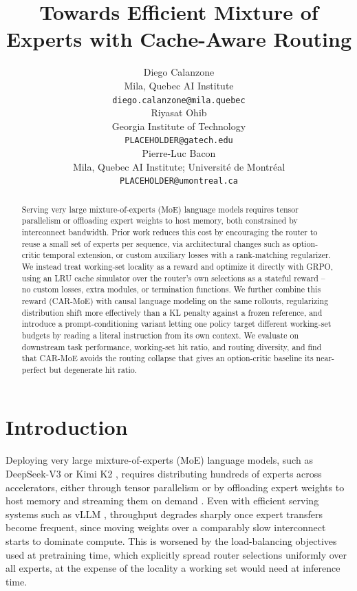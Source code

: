 \documentclass{article}
\title{Towards Efficient Mixture of Experts with Cache-Aware Routing}
\author{
  Diego Calanzone \\
  Mila, Quebec AI Institute \\
  \texttt{diego.calanzone@mila.quebec} \\[1em]
  Riyasat Ohib \\
  Georgia Institute of Technology \\
  \texttt{PLACEHOLDER@gatech.edu} \\[1em]
  Pierre-Luc Bacon \\
  Mila, Quebec AI Institute; Universit\'e de Montr\'eal \\
  \texttt{PLACEHOLDER@umontreal.ca}
}
\begin{document}
\maketitle

\begin{abstract}
Serving very large mixture-of-experts (MoE) language models requires tensor parallelism
or offloading expert weights to host memory, both constrained by interconnect bandwidth.
Prior work reduces this cost by encouraging the router to reuse a small set of experts per
sequence, via architectural changes such as option-critic temporal extension, or custom
auxiliary losses with a rank-matching regularizer. We instead treat working-set locality
as a reward and optimize it directly with GRPO, using an LRU cache simulator over the
router's own selections as a stateful reward -- no custom losses, extra modules, or
termination functions. We further combine this reward (CAR-MoE) with causal language
modeling on the same rollouts, regularizing distribution shift more effectively than a KL
penalty against a frozen reference, and introduce a prompt-conditioning variant letting
one policy target different working-set budgets by reading a literal instruction from its
own context. We evaluate on downstream task performance, working-set hit ratio, and
routing diversity, and find that CAR-MoE avoids the routing collapse that gives an
option-critic baseline its near-perfect but degenerate hit ratio.
\end{abstract}

\section{Introduction}

Deploying very large mixture-of-experts (MoE) language models, such as DeepSeek-V3
\citep{liu2024deepseekv3} or Kimi K2 \citep{moonshot2025kimi}, requires distributing
hundreds of experts across accelerators, either through tensor parallelism or by
offloading expert weights to host memory and streaming them on demand
\citep{eliseev2023offloading}. Even with efficient serving systems such as vLLM
\citep{kwon2023vllm}, throughput degrades sharply once expert transfers become frequent,
since moving weights over a comparably slow interconnect starts to dominate compute. This
is worsened by the load-balancing objectives used at pretraining time, which explicitly
spread router selections uniformly over all experts, at the expense of the locality a
working set would need at inference time.
\end{document}
